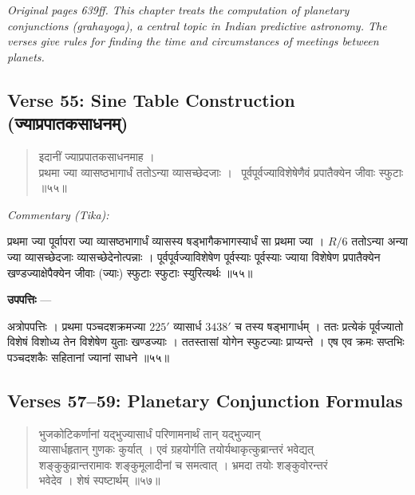 \documentclass[11pt,a4paper]{article}
\newcommand{\dev}[1]{{\devanagarifont #1}}
\newcommand{\skt}[1]{{\devanagarifont\color{sktcolor} #1}}
\newenvironment{shloka}{%
  \begin{quote}%
  \smallskip%
  \devanagarifont\color{sktcolor}%
}{%
  \smallskip%
  \end{quote}%
}
\newenvironment{tika}{%
  \smallskip%
  \noindent\textit{Commentary (Tika):}\par%
  \smallskip%
  \hindifont\small%
}{%
  \par\smallskip%
}
\newenvironment{upapatti}{%
  \smallskip%
  \noindent\textbf{\devanagarifont उपपत्तिः} — \devanagarifont\small%
}{%
  \par\smallskip%
}
\newcommand{\ednote}[1]{\textcolor{notecolor}{\textit{#1}}}
\begin{document}
\ednote{Original pages 639ff. This chapter treats the computation of planetary conjunctions (grahayoga), a central topic in Indian predictive astronomy. The verses give rules for finding the time and circumstances of meetings between planets.}

\subsection*{Verse 55: Sine Table Construction (\dev{ज्याप्रपातकसाधनम्})}

\begin{shloka}
\skt{इदानीं ज्याप्रपातकसाधनमाह ।}\\[0.5em]
\skt{प्रथमा ज्या व्यासष्ठभागार्धं ततोऽन्या व्यासच्छेदजाः ।}\
\skt{पूर्वपूर्वज्याविशेषेणैवं प्रपातैक्येन जीवाः स्फुटाः} ॥५५॥
\end{shloka}

\vspace{0.3cm}
\begin{tika}
\skt{प्रथमा ज्या} पूर्वापरा ज्या \skt{व्यासष्ठभागार्धं} व्यासस्य षड्भागैकभागस्यार्धं सा प्रथमा ज्या । $R/6$ \skt{ततोऽन्या} अन्या ज्या \skt{व्यासच्छेदजाः} व्यासच्छेदेनोत्पन्नाः । \skt{पूर्वपूर्वज्याविशेषेण} पूर्वस्याः पूर्वस्याः ज्याया विशेषेण \skt{प्रपातैक्येन} खण्डज्याक्षेपैक्येन \skt{जीवाः} (ज्याः) \skt{स्फुटाः} स्फुटाः स्युरित्यर्थः ॥५५॥
\end{tika}

\vspace{0.3cm}
\begin{upapatti}
\skt{अत्रोपपत्तिः} । प्रथमा पञ्चदशक्रमज्या $225'$ व्यासार्ध $3438'$ च तस्य षड्भागार्धम् । ततः प्रत्येकं पूर्वज्यातो विशेषं विशोध्य तेन विशेषेण युताः खण्डज्याः । ततस्तासां योगेन स्फुटज्याः प्राप्यन्ते । एष एव क्रमः सप्तभिः पञ्चदशकैः सहितानां ज्यानां साधने ॥५५॥
\end{upapatti}

\subsection*{Verses 57--59: Planetary Conjunction Formulas}

\begin{shloka}
\skt{भुजकोटिकर्णानां यद्भुज्यासार्धं परिणामनार्थं तान् यद्भुज्यान्}\\
\skt{व्यासार्धहृतान् गुणकः कुर्यात् । एवं ग्रहयोर्गति तयोर्यथाकृत्कुब्रान्तरं भवेद्यत्}\\
\skt{शङ्कुकुव्रान्तरामावः शङ्कुमूलादीनां च समत्वात् । भ्रमदा तयोः शङ्कुवोरन्तरं}\\
\skt{भवेदेव । शेषं स्पष्टार्थम्} ॥५७॥
\end{shloka}
\end{document}
